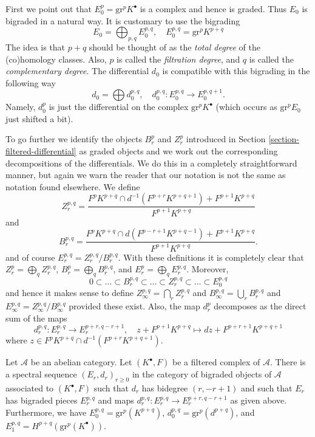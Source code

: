 \medskip\noindent
First we point out that $E_0^p = \text{gr}^p K^\bullet$ is a
complex and hence is graded. Thus $E_0$ is bigraded in a natural
way. It is customary to use the bigrading
$$
E_0 = \bigoplus\nolimits_{p, q} E_0^{p, q},
\quad
E_0^{p, q} = \text{gr}^p K^{p + q}
$$
The idea is that $p + q$ should be thought of as the {\it total degree} of
the (co)homology classes. Also, $p$ is called the {\it filtration degree},
and $q$ is called the {\it complementary degree}.
The differential $d_0$ is compatible with this
bigrading in the following way
$$
d_0  = \bigoplus d_0^{p, q},
\quad
d_0^{p, q} : E_0^{p, q} \to E_0^{p, q + 1}.
$$
Namely, $d_0^p$ is just the differential on the complex
$\text{gr}^p K^\bullet$ (which occurs as $\text{gr}^pE_0$ just shifted
a bit).

\medskip\noindent
To go further we identify the objects $B_r^p$ and $Z_r^p$ introduced
in Section \ref{section-filtered-differential} as graded objects and
we work out the corresponding decompositions of the differentials.
We do this in a completely straightforward manner, but again we warn
the reader that our notation is not the same as notation found
elsewhere. We define
$$
Z_r^{p, q} =
\frac{F^pK^{p + q} \cap d^{-1}(F^{p + r}K^{p + q + 1}) + F^{p + 1}K^{p + q}}
{F^{p + 1}K^{p + q}}
$$
and
$$
B_r^{p, q} =
\frac{F^pK^{p + q} \cap d(F^{p - r + 1}K^{p + q - 1}) + F^{p + 1}K^{p + q}}
{F^{p + 1}K^{p + q}}.
$$
and of course $E_r^{p, q} = Z_r^{p, q}/B_r^{p, q}$.
With these definitions it is completely clear that
$Z_r^p = \bigoplus_q Z_r^{p, q}$,
$B_r^p = \bigoplus_q B_r^{p, q}$, and
$E_r^p = \bigoplus_q E_r^{p, q}$. Moreover,
$$
0 \subset \ldots \subset B_r^{p, q} \subset
\ldots
\subset Z_r^{p, q} \subset \ldots \subset E_0^{p, q}
$$
and hence it makes sense to define
$Z_\infty^{p, q} = \bigcap_r Z_r^{p, q}$ and
$B_\infty^{p, q} = \bigcup_r B_r^{p, q}$ and
$E_\infty^{p, q} = Z_\infty^{p, q}/B_\infty^{p, q}$
provided these exist.
Also, the map $d_r^p$ decomposes as the direct sum of the maps
$$
d_r^{p, q} : E_r^{p, q} \longrightarrow E_r^{p + r, q - r + 1},
\quad
z + F^{p + 1}K^{p + q}
\mapsto
dz + F^{p + r + 1}K^{p + q + 1}
$$
where $z \in F^pK^{p + q} \cap d^{-1}(F^{p + r}K^{p + q + 1})$.

\begin{lemma}
\label{lemma-spectral-sequence-filtered-complex}
Let $\mathcal{A}$ be an abelian category. Let $(K^\bullet, F)$ be a
filtered complex of $\mathcal{A}$. There is a spectral sequence
$(E_r, d_r)_{r \geq 0}$ in the category of bigraded objects of $\mathcal{A}$
associated to $(K^\bullet, F)$ such that $d_r$ has bidegree $(r, - r + 1)$
and such that $E_r$ has bigraded pieces $E_r^{p, q}$ and maps
$d_r^{p, q} : E_r^{p, q} \to E_r^{p + r, q - r + 1}$ as given above.
Furthermore, we have $E_0^{p, q} = \text{gr}^p(K^{p + q})$,
$d_0^{p, q} = \text{gr}^p(d^{p + q})$,
and $E_1^{p, q} = H^{p + q}(\text{gr}^p(K^\bullet))$.
\end{lemma}

